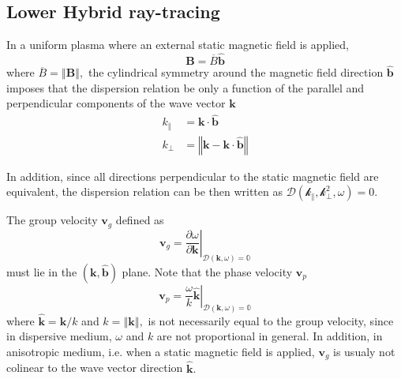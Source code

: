 \documentclass[a4paper,12pt]{article}%
\begin{document}
\subsection{Lower Hybrid ray-tracing}

\bigskip

\bigskip

In a uniform plasma where an external static magnetic field is applied,
\begin{equation}
\mathbf{B=}\overline{B}\widehat{\mathbf{b}}%
\end{equation}
where $\overline{B}=\left\Vert \mathbf{B}\right\Vert ,$ the cylindrical
symmetry around the magnetic field direction $\widehat{\mathbf{b}}$ imposes
that the dispersion relation be only a function of the parallel and
perpendicular components of the wave vector $\mathbf{k}$%
\begin{align}
k_{\Vert}  &  =\mathbf{k\cdot}\widehat{\mathbf{b}}\\
k_{\bot}  &  =\left\Vert \mathbf{k-k\cdot}\widehat{\mathbf{b}}\right\Vert
\end{align}


In addition, since all directions perpendicular to the static magnetic field
are equivalent, the dispersion relation can be then written as
$\mathcal{D\left(  k_{\Vert},k_{\bot}^{2},\omega\right)  =0.}$

The group velocity $\mathbf{v}_{g}$ defined as%
\begin{equation}
\mathbf{v}_{g}=\left.  \frac{\partial\omega}{\partial\mathbf{k}}\right\vert
_{\mathcal{D\left(  \mathbf{k},\omega\right)  }\mathbb{=0}}
\label{groupvelocity}%
\end{equation}
must lie in the $\left(  \mathbf{k,}\widehat{\mathbf{b}}\right)  $ plane. Note
that the phase velocity $\mathbf{v}_{p}$%
\begin{equation}
\mathbf{v}_{p}=\left.  \frac{\omega}{k}\widehat{\mathbf{k}}\right\vert
_{\mathcal{D\left(  \mathbf{k},\omega\right)  }\mathbb{=0}}
\label{phasevelocity}%
\end{equation}
where $\widehat{\mathbf{k}}=\mathbf{k}/k$ and $k=\left\Vert \mathbf{k}%
\right\Vert ,$ is not necessarily equal to the group velocity, since in
dispersive medium, $\omega$ and $k$ are not proportional in general. In
addition, in anisotropic medium, i.e. when a static magnetic field is applied,
$\mathbf{v}_{g}$ is usualy not colinear to the wave vector direction
$\widehat{\mathbf{k}}.$

\bigskip

\bigskip
\end{document}
